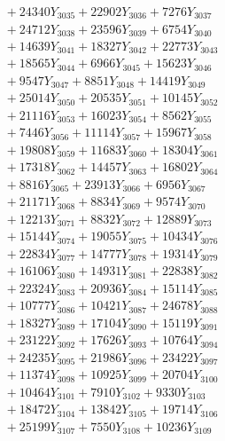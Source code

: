 \documentclass[a4paper,10pt]{article}
\begin{document}
{\begin{align}
&\;  + 24340 Y_{3035} + 22902 Y_{3036} + 7276 Y_{3037} \\[0.3ex]
&\;  + 24712 Y_{3038} + 23596 Y_{3039} + 6754 Y_{3040} \\[0.3ex]
&\;  + 14639 Y_{3041} + 18327 Y_{3042} + 22773 Y_{3043} \\[0.3ex]
&\;  + 18565 Y_{3044} + 6966 Y_{3045} + 15623 Y_{3046} \\[0.3ex]
&\;  + 9547 Y_{3047} + 8851 Y_{3048} + 14419 Y_{3049} \\[0.3ex]
&\;  + 25014 Y_{3050} + 20535 Y_{3051} + 10145 Y_{3052} \\[0.3ex]
&\;  + 21116 Y_{3053} + 16023 Y_{3054} + 8562 Y_{3055} \\[0.3ex]
&\;  + 7446 Y_{3056} + 11114 Y_{3057} + 15967 Y_{3058} \\[0.5ex]\allowbreak
&\;  + 19808 Y_{3059} + 11683 Y_{3060} + 18304 Y_{3061} \\[0.3ex]
&\;  + 17318 Y_{3062} + 14457 Y_{3063} + 16802 Y_{3064} \\[0.3ex]
&\;  + 8816 Y_{3065} + 23913 Y_{3066} + 6956 Y_{3067} \\[0.3ex]
&\;  + 21171 Y_{3068} + 8834 Y_{3069} + 9574 Y_{3070} \\[0.3ex]
&\;  + 12213 Y_{3071} + 8832 Y_{3072} + 12889 Y_{3073} \\[0.3ex]
&\;  + 15144 Y_{3074} + 19055 Y_{3075} + 10434 Y_{3076} \\[0.3ex]
&\;  + 22834 Y_{3077} + 14777 Y_{3078} + 19314 Y_{3079} \\[0.3ex]
&\;  + 16106 Y_{3080} + 14931 Y_{3081} + 22838 Y_{3082} \\[0.3ex]
&\;  + 22324 Y_{3083} + 20936 Y_{3084} + 15114 Y_{3085} \\[0.3ex]
&\;  + 10777 Y_{3086} + 10421 Y_{3087} + 24678 Y_{3088} \\[0.5ex]\allowbreak
&\;  + 18327 Y_{3089} + 17104 Y_{3090} + 15119 Y_{3091} \\[0.3ex]
&\;  + 23122 Y_{3092} + 17626 Y_{3093} + 10764 Y_{3094} \\[0.3ex]
&\;  + 24235 Y_{3095} + 21986 Y_{3096} + 23422 Y_{3097} \\[0.3ex]
&\;  + 11374 Y_{3098} + 10925 Y_{3099} + 20704 Y_{3100} \\[0.3ex]
&\;  + 10464 Y_{3101} + 7910 Y_{3102} + 9330 Y_{3103} \\[0.3ex]
&\;  + 18472 Y_{3104} + 13842 Y_{3105} + 19714 Y_{3106} \\[0.3ex]
&\;  + 25199 Y_{3107} + 7550 Y_{3108} + 10236 Y_{3109} \\[0.3ex]

\end{align}}
\end{document}
